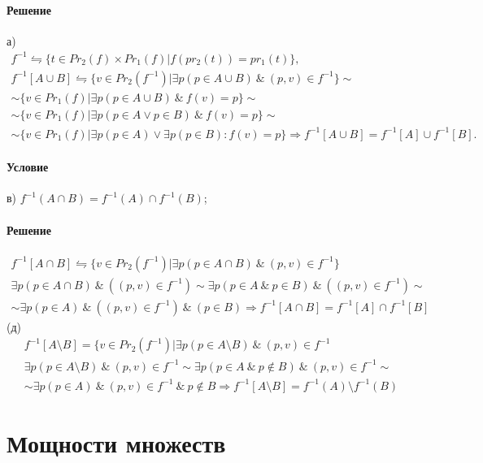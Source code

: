 \documentclass[a4paper,12pt]{article}
\begin{document}
\paragraph*{Решение}
а)
\begin{gather*}
f^{-1} \leftrightharpoons \{t\in Pr_2(f)\times Pr_1(f)|f(pr_2(t)) = pr_1(t) \}, \\
f^{-1}[A\cup B] \leftrightharpoons \{v\in Pr_2(f^{-1})|\exists p(p\in A\cup B) \ \& \ (p,v) \in f^{-1}\} \sim \\
\sim \{v\in Pr_1(f)|\exists p(p\in A\cup B) \ \& \ f(v) = p\} \sim \\
\sim \{v\in Pr_1(f)|\exists p(p\in A \vee p\in B) \ \& \ f(v)=p \}\sim \\
\sim \{v\in Pr_1(f)|\exists p(p\in A) \vee \exists p(p\in B): f(v)=p\} \Rightarrow f^{-1}[A\cup B] = f^{-1}[A] \cup f^{-1}[B].
\end{gather*}
\paragraph*{Условие}
в) $f^{-1} (A\cap B) = f^{-1} (A) \cap f^{-1} (B)$; \\
\paragraph*{Решение}
\begin{gather*}
f^{-1}[A\cap B] \leftrightharpoons \{v\in Pr_2(f^{-1})|\exists p(p\in A\cap B) \ \& \ (p,v) \in f^{-1}\}\\
\exists p(p\in A\cap B) \ \& \ ((p,v) \in f^{-1}) \sim \exists p(p\in A \ \& \ p\in B) \ \& \ ((p,v) \in f^{-1}) \sim \\
\sim \exists p(p\in A) \ \& \ ((p,v) \in f^{-1}) \ \& \ (p\in B)  \Rightarrow f^{-1}[A\cap B] = f^{-1}[A] \cap f^{-1}[B]
\end{gather*}
(д)
\begin{gather*}
 f^{-1}[A\setminus B] = \{v\in Pr_2(f^{-1})|\exists p(p\in A\setminus B) \ \& \ (p,v)\in f^{-1} \\
\exists p(p\in A\setminus B) \ \& \ (p,v)\in f^{-1} \sim \exists p(p\in A \ \& \ p\notin B) \ \& \ (p,v)\in f^{-1} \sim \\
\sim \exists p(p\in A) \ \& \ (p,v)\in f^{-1} \ \& \ p\notin B \Rightarrow f^{-1}[A\setminus B] =  f^{-1} (A)\setminus f^{-1}(B)
\end{gather*}

\section{Мощности множеств}
\end{document}
